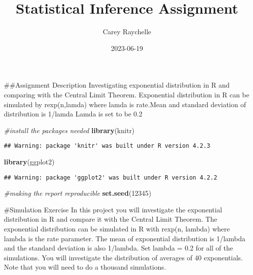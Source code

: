 \documentclass[
]{article}
\title{Statistical Inference Assignment}
\author{Carey Raychelle}
\date{2023-06-19}
\newenvironment{Shaded}{\begin{snugshade}}{\end{snugshade}}
\newcommand{\CommentTok}[1]{\textcolor[rgb]{0.56,0.35,0.01}{\textit{#1}}}
\newcommand{\DecValTok}[1]{\textcolor[rgb]{0.00,0.00,0.81}{#1}}
\newcommand{\FunctionTok}[1]{\textcolor[rgb]{0.13,0.29,0.53}{\textbf{#1}}}
\newcommand{\NormalTok}[1]{#1}
\begin{document}
\maketitle

\#\#Assignment Description Investigating exponential distribution in R
and comparing with the Central Limit Theorem. Exponential distribution
in R can be simulated by rexp(n,lamda) where lamda is rate.Mean and
standard deviation of distribution is 1/lamda Lamda is set to be 0.2

\begin{Shaded}
\begin{Highlighting}[]
\CommentTok{\#install the packages needed}
\FunctionTok{library}\NormalTok{(knitr)}
\end{Highlighting}
\end{Shaded}

\begin{verbatim}
## Warning: package 'knitr' was built under R version 4.2.3
\end{verbatim}

\begin{Shaded}
\begin{Highlighting}[]
\FunctionTok{library}\NormalTok{(ggplot2)}
\end{Highlighting}
\end{Shaded}

\begin{verbatim}
## Warning: package 'ggplot2' was built under R version 4.2.2
\end{verbatim}

\begin{Shaded}
\begin{Highlighting}[]
\CommentTok{\#making the report reproducible}
\FunctionTok{set.seed}\NormalTok{(}\DecValTok{12345}\NormalTok{)}
\end{Highlighting}
\end{Shaded}

\#Simulation Exercise In this project you will investigate the
exponential distribution in R and compare it with the Central Limit
Theorem. The exponential distribution can be simulated in R with rexp(n,
lambda) where lambda is the rate parameter. The mean of exponential
distribution is 1/lambda and the standard deviation is also 1/lambda.
Set lambda = 0.2 for all of the simulations. You will investigate the
distribution of averages of 40 exponentials. Note that you will need to
do a thousand simulations.
\end{document}

